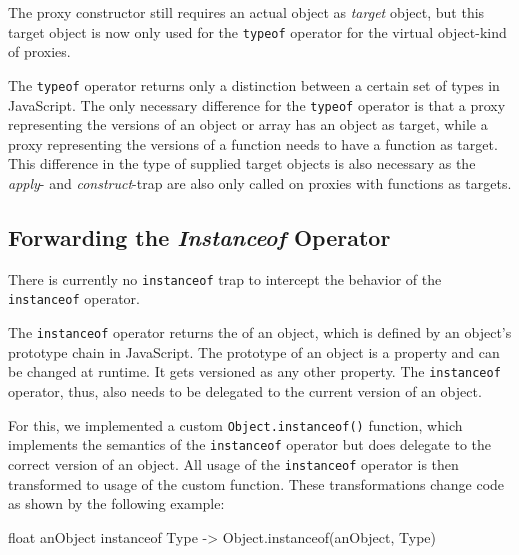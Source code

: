 The proxy constructor still requires an actual object as \emph{target} object, but this target object is now only used for the \lstinline{typeof} operator for the virtual object-kind of proxies.

The \lstinline{typeof} operator returns only a distinction between a certain set of types in JavaScript.
The only necessary difference for the \lstinline{typeof} operator is that a proxy representing the versions of an object or array has an object as target, while a proxy representing the versions of a function needs to have a function as target.
This difference in the type of supplied target objects is also necessary as the \emph{apply}- and \emph{construct}-trap are also only called on proxies with functions as targets.


\subsection{Forwarding the \emph{Instanceof} Operator}

There is currently no \lstinline{instanceof} trap to intercept the behavior of the \lstinline{instanceof} operator.

The \lstinline{instanceof} operator returns the of an object, which is defined by an object's prototype chain in JavaScript.
The prototype of an object is a property and can be changed at runtime.
It gets versioned as any other property.
The \lstinline{instanceof} operator, thus, also needs to be delegated to the current version of an object.

For this, we implemented a custom \lstinline{Object.instanceof()} function, which implements the semantics of the \lstinline{instanceof} operator but does delegate to the correct version of an object.
All usage of the \lstinline{instanceof} operator is then transformed to usage of the custom function.
These transformations change code as shown by the following example: 

\begin{code}[]{}{float}
anObject instanceof Type -> Object.instanceof(anObject, Type)
\end{code}
\iffalse
\end{verbatim}\fi

